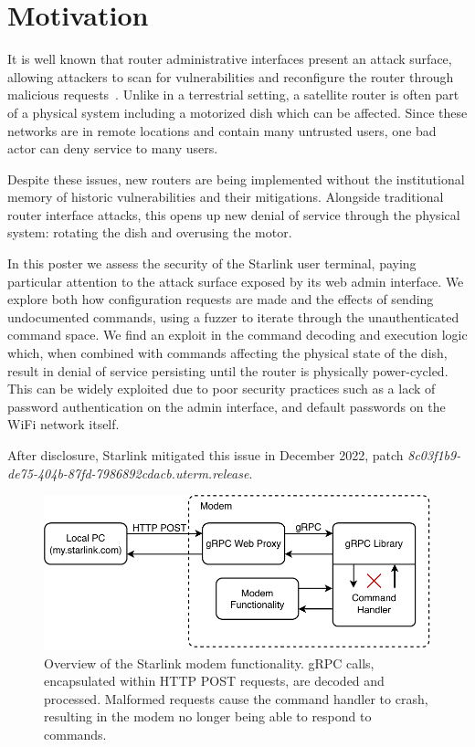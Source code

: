 \section{Motivation}\label{sec:motivation}

It is well known that router administrative interfaces present an attack surface, allowing attackers to scan for vulnerabilities and reconfigure the router through malicious requests~\cite{niemietz2015owning,jeitner2022xdri}.
Unlike in a terrestrial setting, a satellite router is often part of a physical system including a motorized dish which can be affected.
Since these networks are in remote locations and contain many untrusted users, one bad actor can deny service to many users.

Despite these issues, new routers are being implemented without the institutional memory of historic vulnerabilities and their mitigations.
Alongside traditional router interface attacks, this opens up new denial of service through the physical system: rotating the dish and overusing the motor.

In this poster we assess the security of the Starlink user terminal, paying particular attention to the attack surface exposed by its web admin interface.
We explore both how configuration requests are made and the effects of sending undocumented commands, using a fuzzer to iterate through the unauthenticated command space.
We find an exploit in the command decoding and execution logic which, when combined with commands affecting the physical state of the dish, result in denial of service persisting until the router is physically power-cycled.
This can be widely exploited due to poor security practices such as a lack of password authentication on the admin interface, and default passwords on the WiFi network itself.

After disclosure, Starlink mitigated this issue in December 2022, patch \textit{8c03f1b9-de75-404b-87fd-7986892cdacb.uterm.release}.


\begin{figure}
    \centering\includegraphics[width=\columnwidth]{img/modem.pdf}
    \caption{Overview of the Starlink modem functionality. gRPC calls, encapsulated within HTTP POST requests, are decoded and processed. Malformed requests cause the command handler to crash, resulting in the modem no longer being able to respond to commands.}
    \label{fig:modem}
    \vspace{-1em}
\end{figure}
